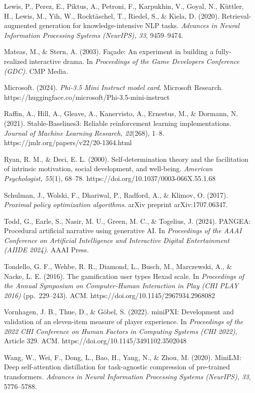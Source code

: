 Lewis, P., Perez, E., Piktus, A., Petroni, F., Karpukhin, V., Goyal, N.,
Küttler, H., Lewis, M., Yih, W., Rocktäschel, T., Riedel, S., \& Kiela,
D. (2020). Retrieval-augmented generation for knowledge-intensive NLP
tasks. \emph{Advances in Neural Information Processing Systems
(NeurIPS), 33}, 9459--9474.

Mateas, M., \& Stern, A. (2003). Façade: An experiment in building a
fully-realized interactive drama. In \emph{Proceedings of the Game
Developers Conference (GDC)}. CMP Media.

Microsoft. (2024). \emph{Phi-3.5 Mini Instruct model card}. Microsoft
Research. https://huggingface.co/microsoft/Phi-3.5-mini-instruct

Raffin, A., Hill, A., Gleave, A., Kanervisto, A., Ernestus, M., \&
Dormann, N. (2021). Stable-Baselines3: Reliable reinforcement learning
implementations. \emph{Journal of Machine Learning Research, 22}(268),
1--8. https://jmlr.org/papers/v22/20-1364.html

Ryan, R. M., \& Deci, E. L. (2000). Self-determination theory and the
facilitation of intrinsic motivation, social development, and
well-being. \emph{American Psychologist, 55}(1), 68--78.
https://doi.org/10.1037/0003-066X.55.1.68

Schulman, J., Wolski, F., Dhariwal, P., Radford, A., \& Klimov, O.
(2017). \emph{Proximal policy optimization algorithms}. arXiv preprint
arXiv:1707.06347.

Todd, G., Earle, S., Nasir, M. U., Green, M. C., \& Togelius, J. (2024).
PANGEA: Procedural artificial narrative using generative AI. In
\emph{Proceedings of the AAAI Conference on Artificial Intelligence and
Interactive Digital Entertainment (AIIDE 2024)}. AAAI Press.

Tondello, G. F., Wehbe, R. R., Diamond, L., Busch, M., Marczewski, A.,
\& Nacke, L. E. (2016). The gamification user types Hexad scale. In
\emph{Proceedings of the Annual Symposium on Computer-Human Interaction
in Play (CHI PLAY 2016)} (pp.~229--243). ACM.
https://doi.org/10.1145/2967934.2968082

Vornhagen, J. B., Thue, D., \& Göbel, S. (2022). miniPXI: Development
and validation of an eleven-item measure of player experience. In
\emph{Proceedings of the 2022 CHI Conference on Human Factors in
Computing Systems (CHI 2022)}, Article 329. ACM.
https://doi.org/10.1145/3491102.3502048

Wang, W., Wei, F., Dong, L., Bao, H., Yang, N., \& Zhou, M. (2020).
MiniLM: Deep self-attention distillation for task-agnostic compression
of pre-trained transformers. \emph{Advances in Neural Information
Processing Systems (NeurIPS), 33}, 5776--5788.

